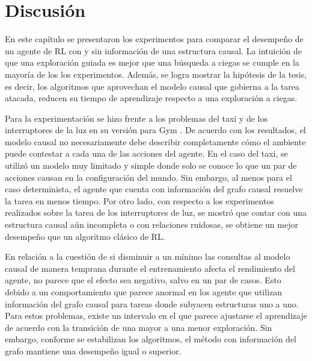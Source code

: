 \section{Discusión}

En este capítulo se presentaron los experimentos para comparar  el desempeño de un agente de RL con y sin información de una estructura causal. La intuición de que una exploración guiada es mejor que una búsqueda a ciegas se cumple en la mayoría de los
los experimentos. 
Además, se logra mostrar la hipótesis de la tesis, es decir, los algoritmos que aprovechan
el modelo causal que gobierna a la tarea atacada, reducen su tiempo de aprendizaje respecto a una exploración a ciegas.

Para la experimentación se hizo frente a los problemas del taxi \cite{Dietterich:2000:HRL:1622262.1622268} y de los interruptores de la luz \cite{nair2019causal} en su versión para Gym \cite{gym2016brockman}.
De acuerdo con los resultados, el modelo causal no necesariamente debe describir completamente cómo el ambiente puede contestar a cada una de las acciones del agente.
En el caso del taxi, se utilizó un modelo muy limitado y simple donde
solo se conoce lo que un par de acciones causan en la configuración del mundo. Sin embargo, al menos para el caso determinista,
el agente que cuenta con información del grafo causal resuelve la tarea en menos tiempo. Por otro lado, con respecto a los experimentos realizados sobre la tarea
de los interruptores de luz, se mostró que contar con una estructura causal aún incompleta o con relaciones ruidosas, se obtiene un mejor desempeño que un algoritmo 
clásico de RL. 

En relación a la cuestión de si disminuir a un mínimo las consultas al modelo causal de manera temprana durante el entrenamiento afecta el rendimiento del agente, no 
parece que el efecto sea negativo, salvo en un par de casos. Esto debido a un comportamiento que parece anormal en los agente que utilizan información del grafo causal para tareas donde subyacen estructuras uno a uno. Para estos problemas, existe un intervalo en el que parece 
ajustarse el aprendizaje de acuerdo con la transición de una mayor a una menor exploración. Sin embargo, conforme se estabilizan los algoritmos, el método con información del grafo mantiene una desempeño igual o superior.

